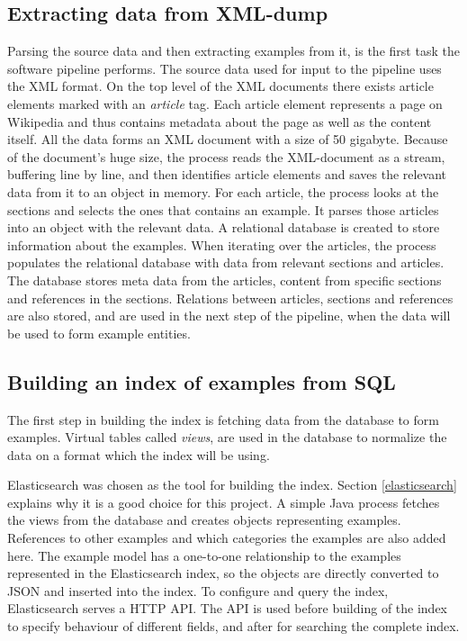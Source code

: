 \subsection{Extracting data from XML-dump}
Parsing the source data and then extracting examples from it, is the first task the software pipeline performs. The source data used for input to the pipeline uses the XML format. On the top level of the XML documents there exists article elements marked with an \textit{article} tag. Each article element represents a page on Wikipedia and thus contains metadata about the page as well as the content itself. All the data forms an XML document with a size of 50 gigabyte. Because of the document's huge size, the process reads the XML-document as a stream, buffering line by line, and then identifies article elements and saves the relevant data from it to an object in memory. For each article, the process looks at the sections and selects the ones that contains an example. It parses those articles into an object with the relevant data. A relational database is created to store information about the examples. When iterating over the articles, the process populates the relational database with data from relevant sections and articles. The database stores meta data from the articles, content from specific sections and references in the sections. Relations between articles, sections and references are also stored, and are used in the next step of the pipeline, when the data will be used to form example entities. 

\subsection{Building an index of examples from SQL}
The first step in building the index is fetching data from the database to form examples. Virtual tables called \textit{views}, are used in the database to normalize the data on a format which the index will be using.

Elasticsearch was chosen as the tool for building the index. Section \ref{elasticsearch} explains why it is a good choice for this project. A simple Java process fetches the views from the database and creates objects representing examples. References to other examples and which categories the examples are also added here. The example model has a one-to-one relationship to the examples represented in the Elasticsearch index, so the objects are directly converted to JSON and inserted into the index. To configure and query the index, Elasticsearch serves a HTTP API. The API is used before building of the index to specify behaviour of different fields, and after for searching the complete index.


